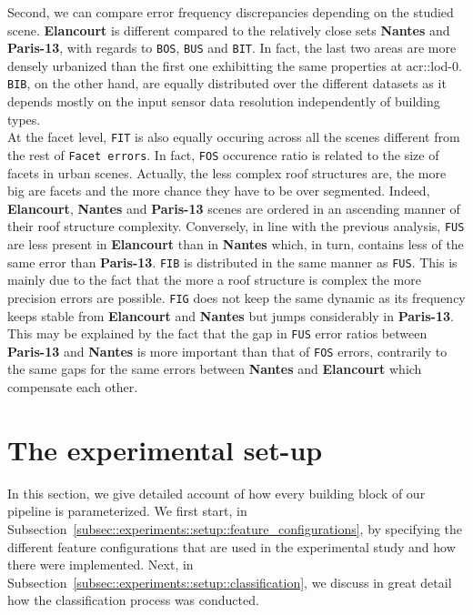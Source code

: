         Second, we can compare error frequency discrepancies depending on the studied scene.
        \textbf{Elancourt} is different compared to the relatively close sets \textbf{Nantes} and \textbf{Paris-13}, with regards to \texttt{BOS}, \texttt{BUS} and \texttt{BIT}.
        In fact, the last two areas are more densely urbanized than the first one exhibitting the same properties at \gls{acr::lod}-0.
        \texttt{BIB}, on the other hand, are equally distributed over the different datasets as it depends mostly on the input sensor data resolution independently of building types.\\
        At the facet level, \texttt{FIT} is also equally occuring across all the scenes different from the rest of \texttt{Facet errors}.
        In fact, \texttt{FOS} occurence ratio is related to the size of facets in urban scenes.
        Actually, the less complex roof structures are, the more big are facets and the more chance they have to be over segmented.
        Indeed, \textbf{Elancourt}, \textbf{Nantes} and \textbf{Paris-13} scenes are ordered in an ascending manner of their roof structure complexity.
        Conversely, in line with the previous analysis, \texttt{FUS} are less present in \textbf{Elancourt} than in \textbf{Nantes} which, in turn, contains less of the same error than \textbf{Paris-13}.
        \texttt{FIB} is distributed in the same manner as \texttt{FUS}.
        This is mainly due to the fact that the more a roof structure is complex the more precision errors are possible.
        \texttt{FIG} does not keep the same dynamic as its frequency keeps stable from \textbf{Elancourt} and \textbf{Nantes} but jumps considerably in \textbf{Paris-13}.
        This may be explained by the fact that the gap in \texttt{FUS} error ratios between \textbf{Paris-13} and \textbf{Nantes} is more important than that of \texttt{FOS} errors, contrarily to the same gaps for the same errors between \textbf{Nantes} and \textbf{Elancourt} which compensate each other.

\section{The experimental set-up}
    \label{sec::experiments::setup}
    In this section, we give detailed account of how every building block of our pipeline is parameterized.
    We first start, in Subsection~\ref{subsec::experiments::setup::feature_configurations}, by specifying the different feature configurations that are used in the experimental study and how there were implemented.
    Next, in Subsection~\ref{subsec::experiments::setup::classification}, we discuss in great detail how the classification process was conducted.

